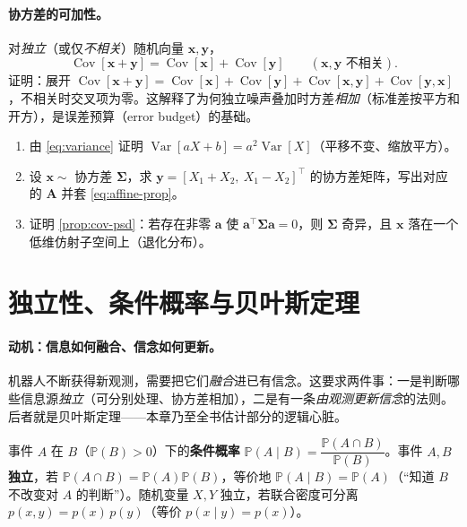 \paragraph{协方差的可加性。}对\emph{独立}（或仅\emph{不相关}）随机向量 $\mathbf{x},\mathbf{y}$，
\begin{equation}
  \operatorname{Cov}[\mathbf{x}+\mathbf{y}]=\operatorname{Cov}[\mathbf{x}]+\operatorname{Cov}[\mathbf{y}]\qquad(\mathbf{x},\mathbf{y}\text{ 不相关}).
  \label{eq:cov-additive}
\end{equation}
证明：展开 $\operatorname{Cov}[\mathbf{x}+\mathbf{y}]=\operatorname{Cov}[\mathbf{x}]+\operatorname{Cov}[\mathbf{y}]+\operatorname{Cov}[\mathbf{x},\mathbf{y}]+\operatorname{Cov}[\mathbf{y},\mathbf{x}]$，不相关时交叉项为零。这解释了为何独立噪声叠加时方差\emph{相加}（标准差按平方和开方），是误差预算（error budget）的基础。

\begin{practice}
\begin{enumerate}
  \item 由 \cref{eq:variance} 证明 $\operatorname{Var}[aX+b]=a^2\operatorname{Var}[X]$（平移不变、缩放平方）。
  \item 设 $\mathbf{x}\sim$ 协方差 $\boldsymbol{\Sigma}$，求 $\mathbf{y}=[X_1+X_2,\ X_1-X_2]^\top$ 的协方差矩阵，写出对应的 $\mathbf{A}$ 并套 \cref{eq:affine-prop}。
  \item 证明 \cref{prop:cov-psd}：若存在非零 $\mathbf{a}$ 使 $\mathbf{a}^\top\boldsymbol{\Sigma}\mathbf{a}=0$，则 $\boldsymbol{\Sigma}$ 奇异，且 $\mathbf{x}$ 落在一个低维仿射子空间上（退化分布）。
\end{enumerate}
\end{practice}

\section{独立性、条件概率与贝叶斯定理}
\label{sec:prob-bayes}

\paragraph{动机：信息如何融合、信念如何更新。}
机器人不断获得新观测，需要把它们\emph{融合}进已有信念。这要求两件事：一是判断哪些信息源\emph{独立}（可分别处理、协方差相加），二是有一条\emph{由观测更新信念}的法则。后者就是贝叶斯定理——本章乃至全书估计部分的逻辑心脏。

\begin{definition}[条件概率与独立性]\label{def:independence}
事件 $A$ 在 $B$（$\mathbb{P}(B)>0$）下的\textbf{条件概率} $\mathbb{P}(A\mid B)=\dfrac{\mathbb{P}(A\cap B)}{\mathbb{P}(B)}$。事件 $A,B$ \textbf{独立}，若 $\mathbb{P}(A\cap B)=\mathbb{P}(A)\mathbb{P}(B)$，等价地 $\mathbb{P}(A\mid B)=\mathbb{P}(A)$（“知道 $B$ 不改变对 $A$ 的判断”）。随机变量 $X,Y$ 独立，若联合密度可分离 $p(x,y)=p(x)\,p(y)$（等价 $p(x\mid y)=p(x)$）。
\end{definition}

